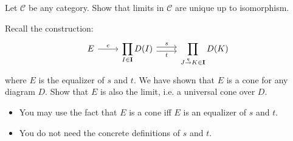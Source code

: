 \begin{exercise}
  Let $\mathscr{C}$ be any category. Show that limits in $\mathscr{C}$ are unique up to isomorphism.
\end{exercise}

\begin{exercise}
  Recall the construction:
  \[
    \begin{tikzcd}
      E \arrow{r}{e} &
      \displaystyle \prod_{I \in \bf{I}} D(I) \arrow[r,shift left, "s"] \arrow[r,shift right,swap,"t"] &
      \displaystyle \prod_{J \overset{q}{\to} K \in \bf{I}} D(K)
    \end{tikzcd}
  \]
  where $E$ is the equalizer of $s$ and $t$.
  We have shown that $E$ is a cone for any diagram $D$. Show that $E$ is also the limit,
  i.e. a universal cone over $D$.
\end{exercise}
\begin{hint}
  \begin{itemize}
  \item You may use the fact that $E$ is a cone iff $E$ is an equalizer of $s$ and $t$.
  \item You do not need the concrete definitions of $s$ and $t$.
  \end{itemize}
\end{hint}



